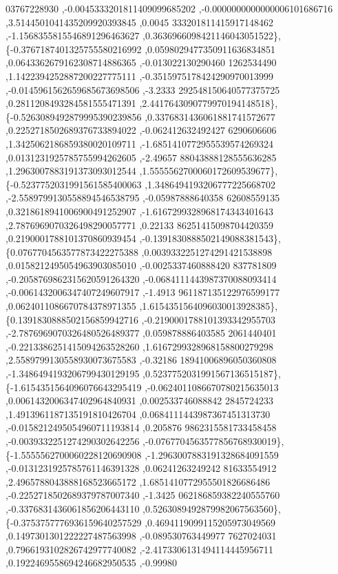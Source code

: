 \begin{DoxyCode}
      03767228930 ,-0.0045333201811409099685202 ,-0.0000000000000006101686716 ,3.5144501041435209920393845 ,0.0045
      333201811415917148462 ,-1.1568355815546891296463627 ,0.3636966098421146043051522\},
\{-0.3767187401325755580216992 ,0.0598029477350911636834851 ,0.0643362679162308714886365 ,-0.013022130290460
      1262534490 ,1.1422394252887200227775111 ,-0.3515975178424290970013999 ,-0.0145961562659685673698506 ,-3.2333
      292548150640577375725 ,0.2811208493284581555471391 ,2.4417643090779970194148518\},
\{-0.5263089492879995390239856 ,0.3376831436061881741572677 ,0.2252718502689376733894022 ,-0.062412632492427
      6290606606 ,1.3425062186859380020109711 ,-1.6851410772955539574269324 ,0.0131231925785755994262605 ,-2.49657
      88043888128555636285 ,1.2963007883191373093012544 ,1.5555562700060172609539677\},
\{-0.5237752031991561585400063 ,1.3486494193206777225668702 ,-2.5589799130558894546538795 ,-0.05987888640358
      62608559135 ,0.3218618941006900491252907 ,-1.6167299328968174343401643 ,2.7876969070326498290057771 ,0.22133
      86251415098704420359 ,0.2190001788101370860939454 ,-0.1391830888502149088381543\},
\{0.0767704563577873422275388 ,0.0039332251274291421538898 ,0.0158212495054963903085010 ,-0.0025337460888420
      837781809 ,-0.2058769862315620591264320 ,-0.0684111443987370088093414 ,-0.0061432006347407249607917 ,-1.4913
      961187135122976599177 ,0.0624011086670784378971355 ,1.6154351564096030013928385\},
\{0.1391830888502156859942716 ,-0.2190001788101393342955703 ,-2.7876969070326480526489377 ,0.059878886403585
      2061440401 ,-0.2213386251415094263528260 ,1.6167299328968158800279298 ,2.5589799130558930073675583 ,-0.32186
      18941006896050360808 ,-1.3486494193206799430129195 ,0.5237752031991567136515187\},
\{-1.6154351564096076643295419 ,-0.0624011086670780215635013 ,0.0061432006347402964840931 ,0.002533746088842
      2845724233 ,1.4913961187135191810426704 ,0.0684111443987367451313730 ,-0.0158212495054960711193814 ,0.205876
      9862315581733458458 ,-0.0039332251274290302642256 ,-0.0767704563577856768930019\},
\{-1.5555562700060228120690908 ,-1.2963007883191328684091559 ,-0.0131231925785761146391328 ,0.06241263249242
      81633554912 ,2.4965788043888168523665172 ,1.6851410772955501826686486 ,-0.2252718502689379787007340 ,-1.3425
      062186859382240555760 ,-0.3376831436061856206443110 ,0.5263089492879982067563560\},
\{-0.3753757776936159640257529 ,0.4694119099115205973049569 ,0.1497301301222227487563998 ,-0.089530763449977
      7627024031 ,0.7966193102826742977740082 ,-2.4173306131494114445956711 ,0.1922469558694246682950535 ,-0.99980

\end{DoxyCode}
